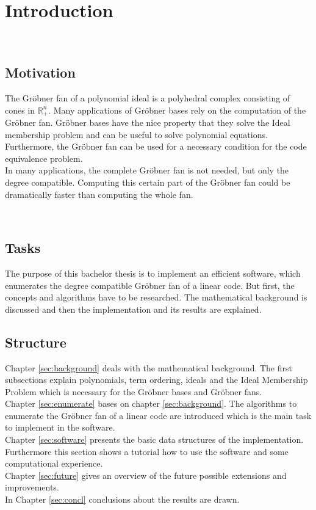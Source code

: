 \section{Introduction}

~\\
\subsection{Motivation}
The Gröbner fan of a polynomial ideal is a polyhedral complex consisting of cones in $\mathbb{R}_{+}^{n}$.
Many applications of Gröbner bases rely on the computation of the Gröbner fan.
Gröbner bases have the nice property that they solve the Ideal membership problem and can be useful to solve polynomial equations.
Furthermore, the Gröbner fan can be used for a necessary condition for the code equivalence problem. \\
In many applications, the complete Gröbner fan is not needed, but only the degree compatible. 
Computing this certain part of the Gröbner fan could be dramatically faster than computing the whole fan.

~\\

\subsection{Tasks}
The purpose of this bachelor thesis is to implement an efficient software, which enumerates the degree compatible Gröbner fan of a linear code. But first, the concepts and algorithms have to be researched. The mathematical background is discussed and then the implementation and its results are explained. 

\newpage

\subsection{Structure}
Chapter \ref{sec:background} deals with the mathematical background. The first subsections explain polynomials, term ordering, ideals and the Ideal Membership Problem which is necessary for the Gröbner bases and Gröbner fans. \\
Chapter \ref{sec:enumerate} bases on chapter \ref{sec:background}. The algorithms to enumerate the Gröbner fan of a linear code are introduced which is the main task to implement in the software.\\
Chapter \ref{sec:software} presents the basic data structures of the implementation. Furthermore this section shows a tutorial how to use the software and some computational experience.\\
Chapter \ref{sec:future} gives an overview of the future possible extensions and improvements.\\
In Chapter \ref{sec:concl} conclusions about the results are drawn.
\newpage